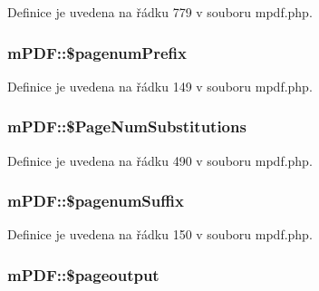 Definice je uvedena na řádku 779 v souboru mpdf.\-php.

\hypertarget{classm_p_d_f_a22bc03ba931feb329ee80a196e8c243b}{
\subsubsection[{\$pagenum\-Prefix}]{\setlength{\rightskip}{0pt plus 5cm}m\-P\-D\-F\-::\$pagenum\-Prefix}}\label{classm_p_d_f_a22bc03ba931feb329ee80a196e8c243b}


Definice je uvedena na řádku 149 v souboru mpdf.\-php.

\hypertarget{classm_p_d_f_ac64f6bfa220781f9e59ffe4ad52b9326}{
\subsubsection[{\$\-Page\-Num\-Substitutions}]{\setlength{\rightskip}{0pt plus 5cm}m\-P\-D\-F\-::\$\-Page\-Num\-Substitutions}}\label{classm_p_d_f_ac64f6bfa220781f9e59ffe4ad52b9326}


Definice je uvedena na řádku 490 v souboru mpdf.\-php.

\hypertarget{classm_p_d_f_a2bc35ab6e04ae7a92f3612794bc3af59}{
\subsubsection[{\$pagenum\-Suffix}]{\setlength{\rightskip}{0pt plus 5cm}m\-P\-D\-F\-::\$pagenum\-Suffix}}\label{classm_p_d_f_a2bc35ab6e04ae7a92f3612794bc3af59}


Definice je uvedena na řádku 150 v souboru mpdf.\-php.

\hypertarget{classm_p_d_f_ade5f2b7b3c4ec3deff44358c6ab7fede}{
\subsubsection[{\$pageoutput}]{\setlength{\rightskip}{0pt plus 5cm}m\-P\-D\-F\-::\$pageoutput}}\label{classm_p_d_f_ade5f2b7b3c4ec3deff44358c6ab7fede}


